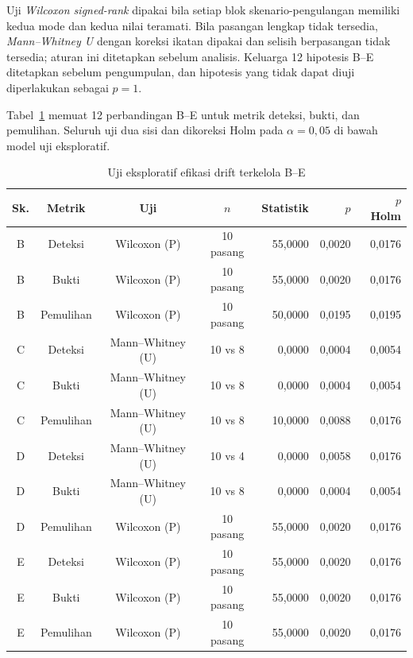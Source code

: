 Uji \textit{Wilcoxon signed-rank} dipakai bila setiap blok skenario-pengulangan memiliki kedua mode dan kedua nilai teramati. Bila pasangan lengkap tidak tersedia, \textit{Mann--Whitney U} dengan koreksi ikatan dipakai dan selisih berpasangan tidak tersedia; aturan ini ditetapkan sebelum analisis. Keluarga 12 hipotesis B--E ditetapkan sebelum pengumpulan, dan hipotesis yang tidak dapat diuji diperlakukan sebagai $p=1$.

Tabel~\ref{tab:lampiran-b-uji} memuat 12 perbandingan B--E untuk metrik deteksi, bukti, dan pemulihan. Seluruh uji dua sisi dan dikoreksi Holm pada $\alpha=0{,}05$ di bawah model uji eksploratif.

\begin{table}[H]
  \centering
  \scriptsize
  \setlength{\tabcolsep}{2pt}
  \caption{Uji eksploratif efikasi drift terkelola B--E}
  \label{tab:lampiran-b-uji}
  \begin{tabularx}{\textwidth}{|c|c|c|c|r|r|r|}
    \hline
    Sk. & Metrik & Uji & $n$ & Statistik & $p$ & $p$ Holm \\
    \hline
    B & Deteksi & Wilcoxon (P) & 10 pasang & 55,0000 & 0,0020 & 0,0176 \\
    \hline
    B & Bukti & Wilcoxon (P) & 10 pasang & 55,0000 & 0,0020 & 0,0176 \\
    \hline
    B & Pemulihan & Wilcoxon (P) & 10 pasang & 50,0000 & 0,0195 & 0,0195 \\
    \hline
    C & Deteksi & Mann--Whitney (U) & 10 vs 8 & 0,0000 & 0,0004 & 0,0054 \\
    \hline
    C & Bukti & Mann--Whitney (U) & 10 vs 8 & 0,0000 & 0,0004 & 0,0054 \\
    \hline
    C & Pemulihan & Mann--Whitney (U) & 10 vs 8 & 10,0000 & 0,0088 & 0,0176 \\
    \hline
    D & Deteksi & Mann--Whitney (U) & 10 vs 4 & 0,0000 & 0,0058 & 0,0176 \\
    \hline
    D & Bukti & Mann--Whitney (U) & 10 vs 8 & 0,0000 & 0,0004 & 0,0054 \\
    \hline
    D & Pemulihan & Wilcoxon (P) & 10 pasang & 55,0000 & 0,0020 & 0,0176 \\
    \hline
    E & Deteksi & Wilcoxon (P) & 10 pasang & 55,0000 & 0,0020 & 0,0176 \\
    \hline
    E & Bukti & Wilcoxon (P) & 10 pasang & 55,0000 & 0,0020 & 0,0176 \\
    \hline
    E & Pemulihan & Wilcoxon (P) & 10 pasang & 55,0000 & 0,0020 & 0,0176 \\
    \hline
  \end{tabularx}
\end{table}

